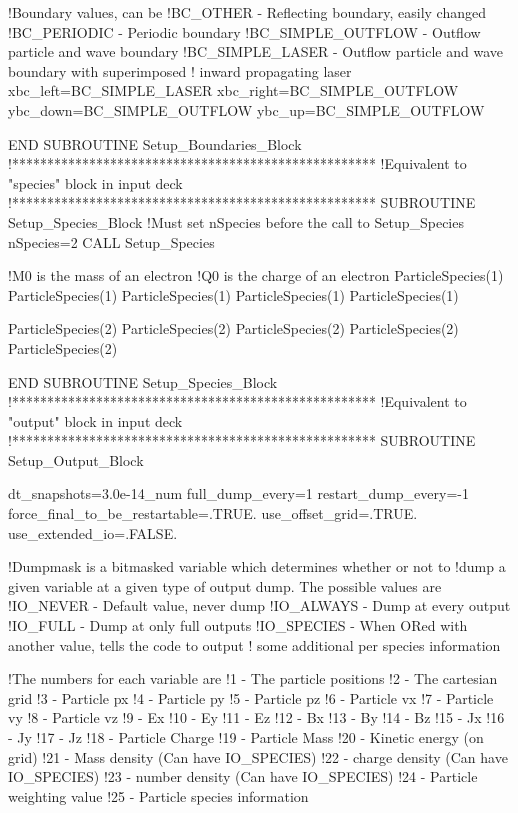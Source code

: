 \documentclass[12pt]{article}
\begin{document}
    !Boundary values, can be
    !BC_OTHER - Reflecting boundary, easily changed
    !BC_PERIODIC - Periodic boundary
    !BC_SIMPLE_OUTFLOW - Outflow particle and wave boundary
    !BC_SIMPLE_LASER - Outflow particle and wave boundary with superimposed
    ! inward propagating laser
    xbc_left=BC_SIMPLE_LASER
    xbc_right=BC_SIMPLE_OUTFLOW
    ybc_down=BC_SIMPLE_OUTFLOW
    ybc_up=BC_SIMPLE_OUTFLOW

  END SUBROUTINE Setup_Boundaries_Block
  !****************************************************
  !Equivalent to "species" block in input deck
  !****************************************************
  SUBROUTINE Setup_Species_Block
    !Must set nSpecies before the call to Setup_Species
    nSpecies=2
    CALL Setup_Species

    !M0 is the mass of an electron
    !Q0 is the charge of an electron
    ParticleSpecies(1)%
    ParticleSpecies(1)%
    ParticleSpecies(1)%
    ParticleSpecies(1)%
    ParticleSpecies(1)%

    ParticleSpecies(2)%
    ParticleSpecies(2)%
    ParticleSpecies(2)%
    ParticleSpecies(2)%
    ParticleSpecies(2)%


  END SUBROUTINE Setup_Species_Block
  !****************************************************
  !Equivalent to "output" block in input deck
  !****************************************************
  SUBROUTINE Setup_Output_Block

    dt_snapshots=3.0e-14_num
    full_dump_every=1
    restart_dump_every=-1
    force_final_to_be_restartable=.TRUE.
    use_offset_grid=.TRUE.
    use_extended_io=.FALSE.

    !Dumpmask is a bitmasked variable which determines whether or not to
    !dump a given variable at a given type of output dump. The possible values are
    !IO_NEVER - Default value, never dump
    !IO_ALWAYS - Dump at every output
    !IO_FULL - Dump at only full outputs
    !IO_SPECIES - When ORed with another value, tells the code to output
    !             some additional per species information

    !The numbers for each variable are
    !1   - The particle positions
    !2   - The cartesian grid
    !3   - Particle px
    !4   - Particle py
    !5   - Particle pz
    !6   - Particle vx
    !7   - Particle vy
    !8   - Particle vz
    !9   - Ex
    !10  - Ey
    !11  - Ez
    !12  - Bx
    !13  - By
    !14  - Bz
    !15  - Jx
    !16  - Jy
    !17  - Jz
    !18  - Particle Charge
    !19  - Particle Mass
    !20  - Kinetic energy (on grid)
    !21  - Mass density (Can have IO_SPECIES)
    !22  - charge density (Can have IO_SPECIES)
    !23  - number density (Can have IO_SPECIES)
    !24  - Particle weighting value
    !25  - Particle species information
\end{document}
